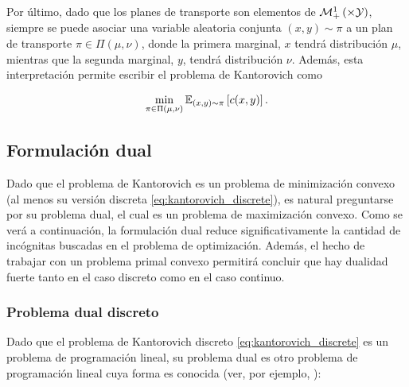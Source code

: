 Por último, dado que los planes de transporte son elementos de $\probmeasure{\xspace\times\yspace}$, siempre se puede asociar una variable aleatoria conjunta $(x,y)\sim\pi$ a un plan de transporte $\pi\in\Pi(\mu,\nu)$, donde la primera marginal, $x$ tendrá distribución $\mu$, mientras que la segunda marginal, $y$, tendrá distribución $\nu$. Además, esta interpretación permite escribir el problema de Kantorovich como

\begin{equation*}
	\min_{\pi\in\Pi(\mu,\nu)} \mathbb{E}_{(x,y)\sim\pi}\left[c(x,y)\right].
\end{equation*}

\subsection{Formulación dual}
\label{ot/kantorovich/dual}

Dado que el problema de Kantorovich es un problema de minimización convexo (al menos su versión discreta \eqref{eq:kantorovich_discrete}), es natural preguntarse por su problema dual, el cual es un problema de maximización convexo. Como se verá a continuación, la formulación dual reduce significativamente la cantidad de incógnitas buscadas en el problema de optimización. Además, el hecho de trabajar con un problema primal convexo permitirá concluir que hay dualidad fuerte tanto en el caso discreto como en el caso continuo.

\subsubsection{Problema dual discreto}

Dado que el problema de Kantorovich discreto \eqref{eq:kantorovich_discrete} es un problema de programación lineal, su problema dual es otro problema de programación lineal cuya forma es conocida (ver, por ejemplo, \cite{boyd2004convex}):

